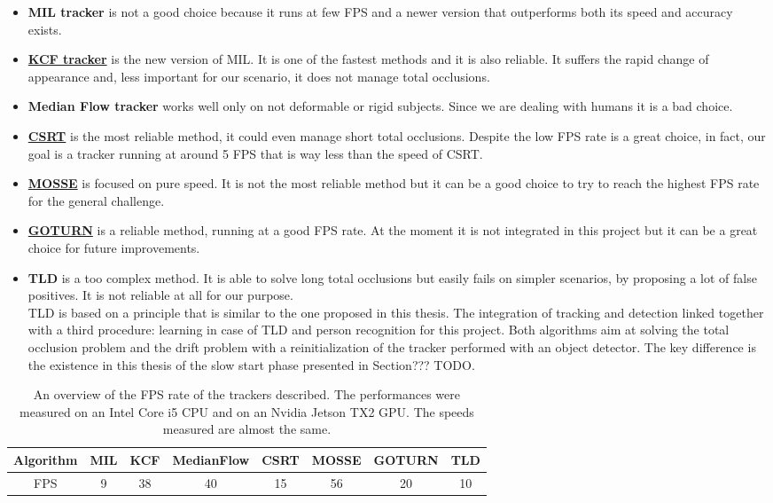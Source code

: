 \begin{itemize}
	\item \textbf{MIL tracker} is not a good choice because it runs at few FPS and a newer version that outperforms both its speed and accuracy exists.
	\item \underline{\textbf{KCF tracker}} is the new version of MIL. It is one of the fastest methods and it is also reliable. It suffers the rapid change of appearance and, less important for our scenario, it does not manage total occlusions.
	\item \textbf{Median Flow tracker} works well only on not deformable or rigid subjects. Since we are dealing with humans it is a bad choice.
	\item \underline{\textbf{CSRT}} is the most reliable method, it could even manage short total occlusions. Despite the low FPS rate is a great choice, in fact, our goal is a tracker running at around 5 FPS that is way less than the speed of CSRT.
	\item \underline{\textbf{MOSSE}} is focused on pure speed. It is not the most reliable method but it can be a good choice to try to reach the highest FPS rate for the general challenge.
	\item \underline{\textbf{GOTURN}} is a reliable method, running at a good FPS rate. At the moment it is not integrated in this project but it can be a great choice for future improvements.
	\item \textbf{TLD} is a too complex method. It is able to solve long total occlusions but easily fails on simpler scenarios, by proposing a lot of false positives. It is not reliable at all for our purpose.\\
	TLD is based on a principle that is similar to the one proposed in this thesis. The integration of tracking and detection linked together with a third procedure: learning in case of TLD and person recognition for this project. Both algorithms aim at solving the total occlusion problem and the drift problem with a reinitialization of the tracker performed with an object detector. The key difference is the existence in this thesis of the slow start phase presented in Section??? TODO.
\end{itemize}

\begin{table}[]
	\centering
	\begin{tabular}{|c|c|c|c|c|c|c|c|}
		\hline
		Algorithm & MIL & KCF & MedianFlow & CSRT & MOSSE & GOTURN & TLD \\ \hline
		FPS  & 9   & 38  & 40         & 15   & 56    & 20     & 10  \\ \hline
	\end{tabular}
	\captionsetup{margin=0.5cm}
	\caption[The FPS rates of the tracking algorithms.]{An overview of the FPS rate of the trackers described. The performances were measured on an Intel Core i5 CPU and on an Nvidia Jetson TX2 GPU. The speeds measured are almost the same.}
	\label{tab:trackersFPS}
\end{table}